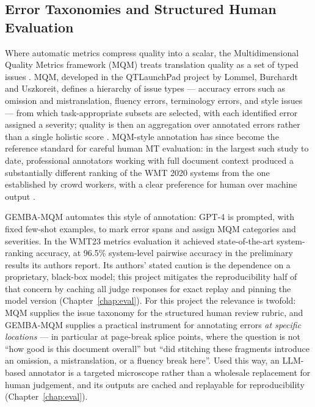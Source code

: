 \subsection{Error Taxonomies and Structured Human Evaluation}

Where automatic metrics compress quality into a scalar, the
Multidimensional Quality Metrics framework (MQM) treats translation
quality as a set of typed issues \cite{burchardt2013mqm}. MQM,
developed in the QTLaunchPad project by Lommel, Burchardt and
Uszkoreit, defines a hierarchy of issue types --- accuracy errors such
as omission and mistranslation, fluency errors, terminology errors,
and style issues --- from which task-appropriate subsets are selected,
with each identified error assigned a severity; quality is then an
aggregation over annotated errors rather than a single holistic score
\cite{burchardt2013mqm}. MQM-style annotation has since become the
reference standard for careful human MT evaluation: in the largest
such study to date, professional annotators working with full document
context produced a substantially different ranking of the WMT 2020
systems from the one established by crowd workers, with a clear
preference for human over machine output \cite{freitag2021mqm}.

GEMBA-MQM \cite{kocmi2023gemba_mqm} automates this style of
annotation: GPT-4 is prompted, with fixed few-shot examples, to mark
error spans and assign MQM categories and severities. In the WMT23
metrics evaluation it achieved state-of-the-art system-ranking
accuracy, at 96.5\% system-level pairwise accuracy in the preliminary
results its authors report. Its authors' stated caution is the
dependence on a proprietary, black-box model; this project mitigates
the reproducibility half of that concern by caching all judge
responses for exact replay and pinning the model version
(Chapter~\ref{chap:eval}).
For this project the relevance is twofold: MQM supplies the issue
taxonomy for the structured human review rubric, and GEMBA-MQM
supplies a practical instrument for annotating errors \emph{at
specific locations} --- in particular at page-break splice points,
where the question is not ``how good is this document overall'' but
``did stitching these fragments introduce an omission, a
mistranslation, or a fluency break here''. Used this way, an LLM-based
annotator is a targeted microscope rather than a wholesale replacement
for human judgement, and its outputs are cached and replayable for
reproducibility (Chapter~\ref{chap:eval}).

